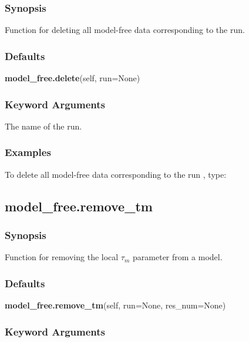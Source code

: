 \subsubsection{Synopsis}

Function for deleting all model-free data corresponding to the run.



\subsubsection{Defaults}

\textsf{\textbf{model\_free.delete}(self, run=None)}


\subsubsection{Keyword Arguments}

  The name of the run. 




\subsubsection{Examples}

To delete all model-free data corresponding to the run , type:





\newpage

\subsection{model\_free.remove\_tm}


\subsubsection{Synopsis}

Function for removing the local $\tau_m$ parameter from a model.



\subsubsection{Defaults}

\textsf{\textbf{model\_free.remove\_tm}(self, run=None, res\_num=None)}


\subsubsection{Keyword Arguments}


